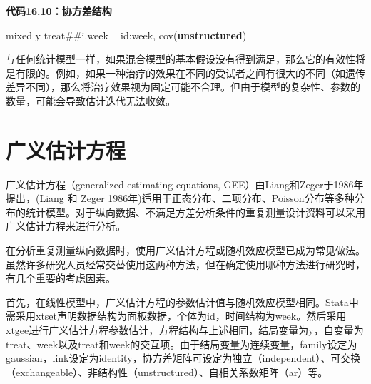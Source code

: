 \documentclass[
  chinese-hans,
  letterpaper,
  DIV=11,
  numbers=noendperiod]{scrreprt}
\newenvironment{Shaded}{\begin{snugshade}}{\end{snugshade}}
\newcommand{\FunctionTok}[1]{\textcolor[rgb]{0.28,0.35,0.67}{#1}}
\newcommand{\KeywordTok}[1]{\textcolor[rgb]{0.00,0.23,0.31}{\textbf{#1}}}
\newcommand{\NormalTok}[1]{\textcolor[rgb]{0.00,0.23,0.31}{#1}}
\begin{document}
\begin{tcolorbox}[enhanced jigsaw, arc=.35mm, bottomrule=.15mm, breakable, colback=white, colframe=quarto-callout-note-color-frame, left=2mm, leftrule=.75mm, opacityback=0, rightrule=.15mm, toprule=.15mm]

\vspace{-3mm}\textbf{代码16.10：协方差结构}\vspace{3mm}

\begin{Shaded}
\begin{Highlighting}[]
\NormalTok{mixed }\FunctionTok{y}\NormalTok{ treat\#\#i.}\FunctionTok{week}\NormalTok{ || id:}\FunctionTok{week}\NormalTok{, cov(}\KeywordTok{unstructured}\NormalTok{)}
\end{Highlighting}
\end{Shaded}

\end{tcolorbox}

与任何统计模型一样，如果混合模型的基本假设没有得到满足，那么它的有效性将是有限的。例如，如果一种治疗的效果在不同的受试者之间有很大的不同（如遗传差异不同），那么将治疗效果视为固定可能不合理。但由于模型的复杂性、参数的数量，可能会导致估计迭代无法收敛。

\section{广义估计方程}\label{ux5e7fux4e49ux4f30ux8ba1ux65b9ux7a0b}

广义估计方程（generalized estimating equations,
GEE）由Liang和Zeger于1986年提出，(Liang 和 Zeger
1986年)适用于正态分布、二项分布、Poisson分布等多种分布的统计模型。对于纵向数据、不满足方差分析条件的重复测量设计资料可以采用广义估计方程来进行分析。

在分析重复测量纵向数据时，使用广义估计方程或随机效应模型已成为常见做法。虽然许多研究人员经常交替使用这两种方法，但在确定使用哪种方法进行研究时，有几个重要的考虑因素。

首先，在线性模型中，广义估计方程的参数估计值与随机效应模型相同。Stata中需采用xtset声明数据结构为面板数据，个体为id，时间结构为week。然后采用xtgee进行广义估计方程参数估计，方程结构与上述相同，结局变量为y，自变量为treat、week以及treat和week的交互项。由于结局变量为连续变量，family设定为gaussian，link设定为identity，协方差矩阵可设定为独立（independent）、可交换（exchangeable）、非结构性（unstructured）、自相关系数矩阵（ar）等。
\end{document}
